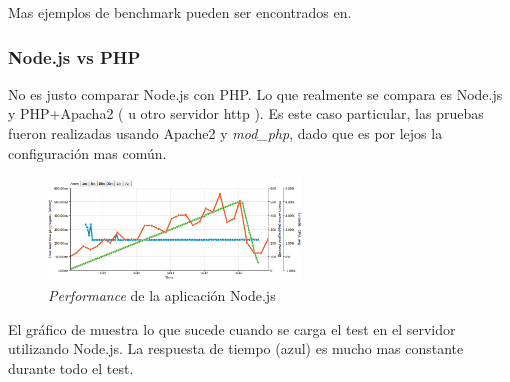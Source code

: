
Mas ejemplos de benchmark pueden ser encontrados en\cite{online_nodejs_java_dzone}.


\subsubsection{Node.js vs PHP\cite{online_nodejs_php_loadimpact}}

No es justo comparar Node.js con PHP. Lo que realmente se compara es Node.js y PHP+Apacha2 ( u otro servidor http ). Es este caso particular, las pruebas fueron realizadas usando Apache2 y \textit{mod\_php}, dado que es por lejos la configuración mas común. 

\begin{figure}[h!]
	\centering
	\includegraphics[width=0.6\textwidth]{figuras/cap2/node_benchmak_loadimpact.png}
	\caption{\textit{Performance} de la aplicación Node.js}
	\label{figure:node_benchmark_nodephp}
\end{figure}

El gráfico de  muestra lo que sucede cuando se carga el test en el servidor utilizando Node.js. La respuesta de tiempo (azul) es mucho mas constante durante todo el test. 


